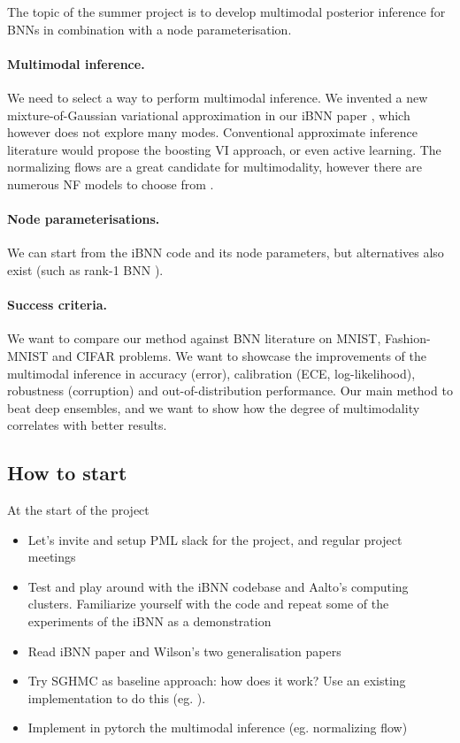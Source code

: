 \documentclass{article}
\begin{document}
The topic of the summer project is to develop multimodal posterior inference for BNNs in combination with a node parameterisation.

\paragraph{Multimodal inference.} We need to select a way to perform multimodal inference. We invented a new mixture-of-Gaussian variational approximation in our iBNN paper \citep{trung2020}, which however does not explore many modes. Conventional approximate inference literature would propose the boosting VI approach, or even active learning. The normalizing flows are a great candidate for multimodality, however there are numerous NF models to choose from \citep{papa21}. 

\paragraph{Node parameterisations.} We can start from the iBNN code and its node parameters, but alternatives also exist (such as rank-1 BNN \citep{dusenberry2020}).

\paragraph{Success criteria.} We want to compare our method against BNN literature on MNIST, Fashion-MNIST and CIFAR problems. We want to showcase the improvements of the multimodal inference in accuracy (error), calibration (ECE, log-likelihood), robustness (corruption) and out-of-distribution performance. Our main method to beat deep ensembles, and we want to show how the degree of multimodality correlates with better results.

\subsection{How to start}

At the start of the project
\begin{itemize}
    \item Let's invite and setup PML slack for the project, and regular project meetings
    \item Test and play around with the iBNN codebase and Aalto's computing clusters. Familiarize yourself with the code and repeat some of the experiments of the iBNN as a demonstration
    \item Read iBNN paper \citep{trung2020} and Wilson's two generalisation papers \citep{izmailov2021,wilson2020b}
    \item Try SGHMC as baseline approach: how does it work? Use an existing implementation to do this (eg. \citet{wenzel2020good}).
    \item Implement in pytorch the multimodal inference (eg. normalizing flow)
\end{itemize}



\end{document}

